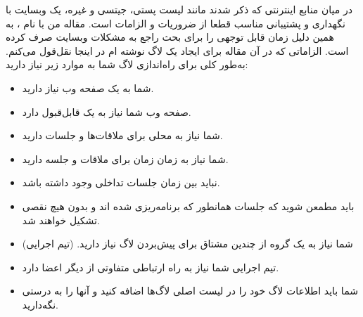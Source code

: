 در میان منابع اینترنتی که ذکر شدند مانند لیست پستی، جیتسی و غیره، یک وبسایت
با نگهداری و پشتیبانی مناسب قطعا از ضروریات و الزامات است. مقاله من با نام
،
به همین دلیل زمان قابل توجهی را برای بحث راجع به مشکلات وبسایت صرف کرده است.
الزاماتی که در آن مقاله برای ایجاد یک لاگ نوشته ام در اینجا نقل‌قول می‌کنم.
به‌طور کلی برای راه‌اندازی لاگ شما به موارد زیر نیاز دارید:


\begin{itemize}
\item
شما به یک صفحه وب نیاز دارید.
\item
صفحه وب شما نیاز به یک  قابل‌قبول دارد.
\item
شما نیاز به محلی برای ملاقات‌ها و جلسات دارید.
\item
شما نیاز به زمان زمان برای ملاقات و جلسه دارید.
\item
نباید بین زمان جلسات تداخلی وجود داشته باشد.
\item
باید مطمعن شوید که جلسات همانطور که برنامه‌ریزی شده اند و بدون هیچ نقصی تشکیل خواهند شد.
\item
شما نیاز به یک گروه از چندین مشتاق برای پیش‌بردن لاگ نیاز دارید. (تیم اجرایی)
\item
تیم اجرایی شما نیاز به راه ارتباطی متفاوتی از دیگر اعضا دارد.
\item
شما باید اطلاعات لاگ خود را در لیست اصلی لاگ‌ها اضافه کنید و آنها را به درستی نگه‌دارید.

\end{itemize}
